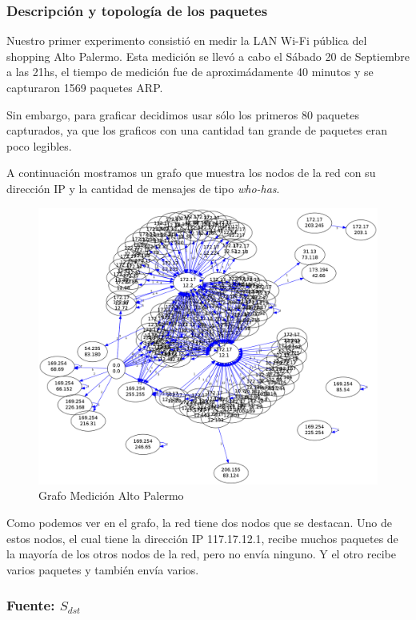 \subsubsection{Descripción y topología de los paquetes}

Nuestro primer experimento consistió en medir la LAN Wi-Fi pública del shopping Alto Palermo. Esta medición se llevó a cabo el Sábado 20 de Septiembre a las 21hs, el tiempo de medición fue de aproximádamente 40 minutos y se capturaron 1569 paquetes ARP.

Sin embargo, para graficar decidimos usar sólo los primeros 80 paquetes capturados, ya que los graficos con una cantidad tan grande de paquetes eran poco legibles.

A continuación mostramos un grafo que muestra los nodos de la red con su dirección IP y la cantidad de mensajes de tipo \emph{who-has}.

\begin{figure}[H]
 \begin{center}
  \includegraphics[width=0.9\linewidth]{../imgs/red-alto-palermo_red.png}
  \caption{Grafo Medición Alto Palermo}
 \end{center}

\end{figure}

Como podemos ver en el grafo, la red tiene dos nodos que se destacan. Uno de estos nodos, el cual tiene la dirección IP 117.17.12.1, recibe muchos paquetes de la mayoría de los otros nodos de la red, pero no envía ninguno. Y el otro recibe varios paquetes y también envía varios.

\subsubsection{Fuente: $S_{dst}$}

